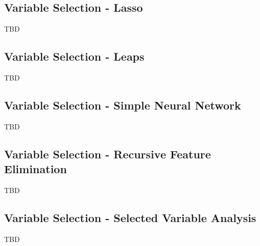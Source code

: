 \subsection{Variable Selection - Lasso}
TBD

\subsection{Variable Selection - Leaps}
TBD

\subsection{Variable Selection - Simple Neural Network}
TBD

\subsection{Variable Selection - Recursive Feature Elimination}
TBD

\subsection{Variable Selection - Selected Variable Analysis}
TBD
